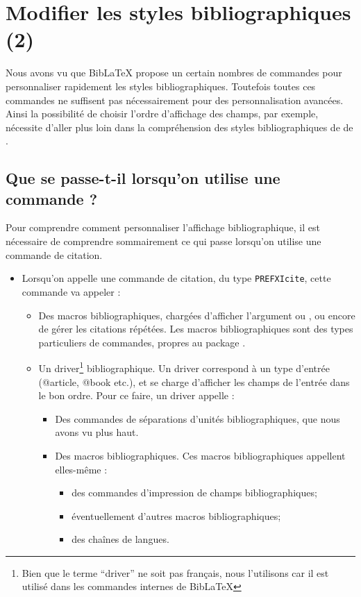 \chapter{Modifier les styles bibliographiques (2)}

\begin{prealable}
	Nous avons vu que BibLaTeX propose un certain nombres de commandes pour personnaliser rapidement les styles bibliographiques. Toutefois toutes ces commandes ne suffisent pas nécessairement pour des personnalisation avancées. 
	Ainsi la possibilité de choisir l'ordre d'affichage des champs, par exemple, nécessite d'aller plus loin dans la compréhension des styles bibliographiques de de .
\end{prealable}



\section{Que se passe-t-il lorsqu'on utilise une commande  ?}

Pour comprendre comment personnaliser l'affichage bibliographique, il est nécessaire de comprendre sommairement ce qui passe lorsqu'on utilise une commande de citation. 

\begin{itemize}
\item Lorsqu'on appelle une commande de citation, du type \verb|PREFXIcite|, cette commande va appeler :
	\begin{itemize}
		\item Des macros bibliographiques, chargées d'afficher l'argument  ou , ou encore de gérer les citations répétées. Les macros bibliographiques sont des types particuliers de commandes, propres au package . 
		\item Un driver\footnote{Bien que le terme \enquote{driver} ne soit pas français, nous l'utilisons car il est utilisé dans les commandes internes de BibLaTeX} bibliographique. Un driver correspond à un type d'entrée (@article, @book etc.), et se charge d'afficher les champs de l'entrée dans le bon ordre. Pour ce faire, un driver appelle :
		\begin{itemize}
			\item Des commandes de séparations d'unités bibliographiques, que nous avons vu plus haut.
			\item Des macros bibliographiques. Ces macros bibliographiques appellent elles-même :
			\begin{itemize}
				\item des commandes d'impression de champs bibliographiques;
				\item éventuellement d'autres macros bibliographiques;
				\item des chaînes de langues.
			\end{itemize}
		\end{itemize}
		
	\end{itemize}
\end{itemize}

